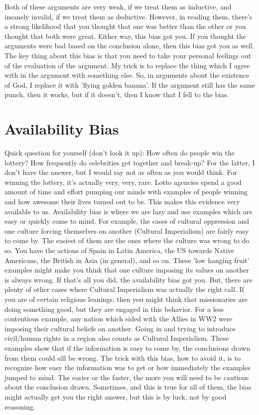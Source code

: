 Both of these arguments are very weak, if we treat them as inductive, and insanely invalid, if we treat them as deductive. However, in reading them, there's a strong likelihood that you thought that one was better than the other or you thought that both were great. Either way, this bias got you. If you thought the arguments were bad based on the conclusion alone, then this bias got you as well. The key thing about this bias is that you need to take your personal feelings out of the evaluation of the argument. My trick is to replace the thing which I agree with in the argument with something else. So, in arguments about the existence of God, I replace it with 'flying golden banana'. If the argument still has the same punch, then it works, but if it doesn't, then I know that I fell to the bias.
\section{Availability Bias}

Quick question for yourself (don't look it up): How often do people win the lottery? How frequently do celebrities get together and break-up? For the latter, I don't have the answer, but I would say not as often as you would think. For winning the lottery, it's actually very, very, rare. Lotto agencies spend a good amount of time and effort pumping our minds with examples of people winning and how awesome their lives turned out to be. This makes this evidence very available to us. Availability bias is where we are lazy and use examples which are easy or quickly come to mind. For example, the cases of cultural oppression and one culture forcing themselves on another (Cultural Imperialism) are fairly easy to come by. The easiest of them are the ones where the culture was wrong to do so. You have the actions of Spain in Latin America, the US towards Native Americans, the British in Asia (in general), and so on. These 'low hanging fruit' examples might make you think that one culture imposing its values on another is always wrong. If that's all you did, the availability bias got you. But, there are plenty of other cases where Cultural Imperialism was actually the right call. If you are of certain religious leanings, then you might think that missionaries are doing something good, but they are engaged in this behavior. For a less contentious example, any nation which sided with the Allies in WW2 were imposing their cultural beliefs on another. Going in and trying to introduce civil/human rights in a region also counts as Cultural Imperialism. These examples show that if the information is easy to come by, the conclusions drawn from them could sill be wrong. The trick with this bias, how to avoid it, is to recognize how easy the information was to get or how immediately the examples jumped to mind. The easier or the faster, the more you will need to be cautious about the conclusion drawn. Sometimes, and this is true for all of them, the bias might actually get you the right answer, but this is by luck, not by good reasoning. 

